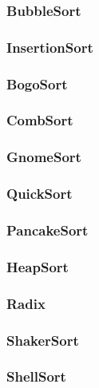 \documentclass{article}
\begin{document}
\subsubsection{BubbleSort}
    
\subsubsection{InsertionSort}
    
\subsubsection{BogoSort}
    
\subsubsection{CombSort}
    
\subsubsection{GnomeSort}
    
\subsubsection{QuickSort}
    
\subsubsection{PancakeSort}
    
\subsubsection{HeapSort}
    
\subsubsection{Radix}
    
\subsubsection{ShakerSort}
    
\subsubsection{ShellSort}
    
\end{document}
